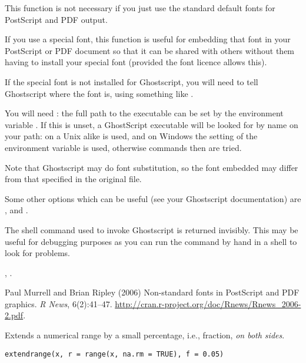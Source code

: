 \begin{Details}\relax
This function is not necessary if you just use the standard
default fonts for PostScript and PDF output.

If you use a special font, this function is useful for
embedding that font in your PostScript or PDF document
so that it can be shared with others without them having
to install your special font (provided the font licence allows this).

If the special font is not installed for Ghostscript,
you will need to tell Ghostscript where the font is, using
something like .

You will need : the full path to the executable can
be set by the environment variable . If this is
unset, a GhostScript executable will be looked for by name on your
path: on a Unix alike  is used, and on Windows the setting
of the environment variable  is used, otherwise commands
 then  are tried.

Note that Ghostscript may do font substitution, so the font embedded
may differ from that specified in the original file.

Some other options which can be useful (see your Ghostscript
documentation) are ,
 and  .
\end{Details}
%
\begin{Value}
The shell command used to invoke Ghostscript is returned
invisibly. This may be useful for debugging purposes as
you can run the command by hand in a shell to look for problems.
\end{Value}
%
\begin{SeeAlso}\relax
{},
.

Paul Murrell and Brian Ripley (2006) Non-standard fonts in PostScript
and PDF graphics. \emph{R News}, 6(2):41--47.
\url{http://cran.r-project.org/doc/Rnews/Rnews_2006-2.pdf}.
\end{SeeAlso}
%
\begin{Description}\relax
Extends a numerical range by a small percentage, i.e., fraction,
\emph{on both sides}.
\end{Description}
%
\begin{Usage}
\begin{verbatim}
extendrange(x, r = range(x, na.rm = TRUE), f = 0.05)
\end{verbatim}
\end{Usage}
